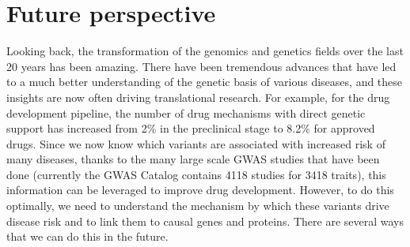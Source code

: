 

\section{Future perspective}

Looking back, the transformation of the genomics and genetics fields over the last 20 years has been amazing. There have been tremendous advances that have led to a much better understanding of the genetic basis of various diseases, and these insights are now often driving translational research. For example, for the drug development pipeline, the number of drug mechanisms with direct genetic support has increased from 2\% in the preclinical stage to 8.2\% for approved drugs\cite{nelsonSupportHumanGenetic2015}. Since we now know which variants are associated with increased risk of many diseases, thanks to the many large scale GWAS studies that have been done (currently the GWAS Catalog\cite{macarthurNewNHGRIEBICatalog2017} contains 4118 studies for 3418 traits), this information can be leveraged to improve drug development. However, to do this optimally, we need to understand the mechanism by which these variants drive disease risk and to link them to causal genes and proteins. There are several ways that we can do this in the future.

